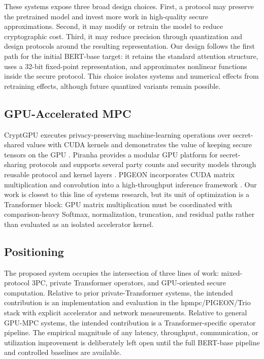 These systems expose three broad design choices. First, a protocol may preserve the pretrained model and invest more work in high-quality secure approximations. Second, it may modify or retrain the model to reduce cryptographic cost. Third, it may reduce precision through quantization and design protocols around the resulting representation. Our design follows the first path for the initial BERT-base target: it retains the standard attention structure, uses a 32-bit fixed-point representation, and approximates nonlinear functions inside the secure protocol. This choice isolates systems and numerical effects from retraining effects, although future quantized variants remain possible.

\subsection{GPU-Accelerated MPC}
CryptGPU executes privacy-preserving machine-learning operations over secret-shared values with CUDA kernels and demonstrates the value of keeping secure tensors on the GPU \cite{tan2021cryptgpu}. Piranha provides a modular GPU platform for secret-sharing protocols and supports several party counts and security models through reusable protocol and kernel layers \cite{watson2022piranha}. PIGEON incorporates CUDA matrix multiplication and convolution into a high-throughput inference framework \cite{harth2025pigeon}. Our work is closest to this line of systems research, but its unit of optimization is a Transformer block: GPU matrix multiplication must be coordinated with comparison-heavy Softmax, normalization, truncation, and residual paths rather than evaluated as an isolated accelerator kernel.

\subsection{Positioning}
The proposed system occupies the intersection of three lines of work: mixed-protocol 3PC, private Transformer operators, and GPU-oriented secure computation. Relative to prior private-Transformer systems, the intended contribution is an implementation and evaluation in the hpmpc/PIGEON/Trio stack with explicit accelerator and network measurements. Relative to general GPU-MPC systems, the intended contribution is a Transformer-specific operator pipeline. The empirical magnitude of any latency, throughput, communication, or utilization improvement is deliberately left open until the full BERT-base pipeline and controlled baselines are available.
